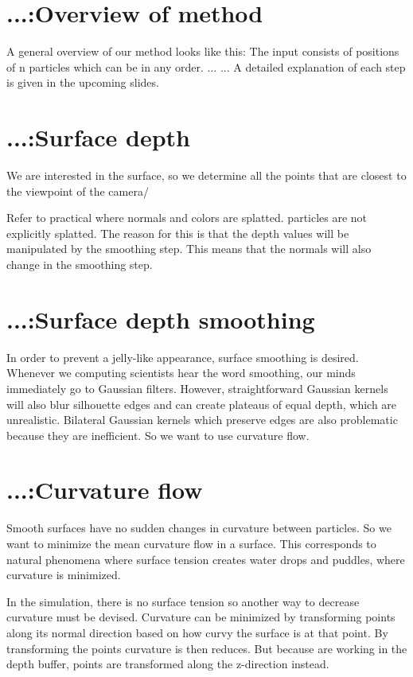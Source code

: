 \documentclass{article}
\begin{document}
\section{...:Overview of method}
A general overview of our method looks like this:
The input consists of positions of n particles which can be in any order.
...
...
A detailed explanation of each step is given in the upcoming slides.

\section{...:Surface depth}
We are interested in the surface, so we determine all the points that are closest to the viewpoint of the camera/

Refer to practical where normals and colors are splatted.
particles are not explicitly splatted.
The reason for this is that the depth values will be manipulated by the smoothing step.
This means that the normals will also change in the smoothing step.

\section{...:Surface depth smoothing} %
\label{sec:_surface_depth_smoothing}
In order to prevent a jelly-like appearance, surface smoothing is desired.
Whenever we computing scientists hear the word smoothing, our minds immediately go to Gaussian filters.
However, straightforward Gaussian kernels will also blur silhouette edges and can create plateaus of equal depth, which are unrealistic.
Bilateral Gaussian kernels which preserve edges are also problematic because they are inefficient.
So we want to use curvature flow.

\section{...:Curvature flow} %
\label{sec:_curvature_flow}
Smooth surfaces have no sudden changes in curvature between particles. 
So we want to minimize the mean curvature flow in a surface.
This corresponds to natural phenomena where surface tension creates water drops and puddles, where curvature is minimized.

In the simulation, there is no surface tension so another way to decrease curvature must be devised.
Curvature can be minimized by transforming points along its normal direction based on how curvy the surface is at that point. By transforming the points curvature is then reduces. But because are working in the depth buffer, points are transformed along the z-direction instead.
\end{document}
